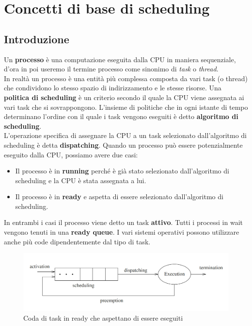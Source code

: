 \documentclass[12pt]{article}
\begin{document}
\section{Concetti di base di scheduling}
\subsection{Introduzione}
Un \textbf{processo} è una computazione eseguita dalla CPU in maniera sequenziale, d'ora in poi useremo il termine processo come sinonimo di \textit{task} o \textit{thread}.
\\
In realtà un processo è una entità più complessa composta da vari task (o thread)
che condividono lo stesso spazio di indirizzamento e le stesse risorse.
Una \textbf{politica di scheduling} è un criterio secondo il quale la CPU viene assegnata ai vari task che si sovrappongono.
L'insieme di politiche che in ogni istante di tempo determinano l'ordine con il quale i task vengono eseguiti è detto \textbf{algoritmo di scheduling}.\\
L'operazione specifica di assegnare la CPU a un task selezionato dall'algoritmo di scheduling è detta \textbf{dispatching}.
Quando un processo può essere potenzialmente eseguito dalla CPU, possiamo avere due casi: 
\begin{itemize}
    \item Il processo è in \textbf{running} perché è già stato selezionato dall'algoritmo di scheduling e la CPU è stata assegnata a lui.
    \item Il processo è in \textbf{ready} e aspetta di essere selezionato dall'algoritmo di scheduling.
\end{itemize}
In entrambi i casi il processo viene detto un task \textbf{attivo}. Tutti i processi in wait vengono tenuti in una \textbf{ready queue}. I vari sistemi operativi possono utilizzare anche più code dipendentemente dal tipo di task.
\begin{figure}
\centering
\includegraphics[width=\textwidth]{pictures/cicloEsecuzione.png}
\caption{Coda di task in ready che aspettano di essere eseguiti}
\end{figure}
\end{document}
